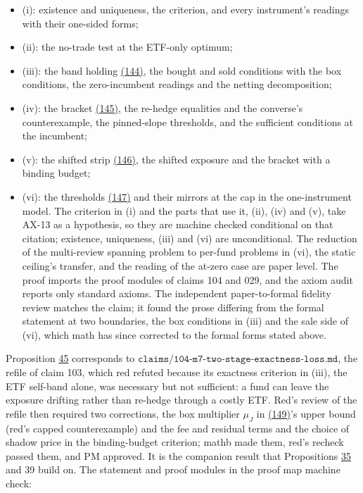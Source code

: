 \documentclass[11pt]{article}
\begin{document}
\begin{itemize}
  \item (i): existence and uniqueness, the criterion, and every instrument's
  readings with their one-sided forms;
  \item (ii): the no-trade test at the ETF-only optimum;
  \item (iii): the band holding \hyperref[eq:144]{(144)}, the bought and sold conditions with
  the box conditions, the zero-incumbent readings and the netting
  decomposition;
  \item (iv): the bracket \hyperref[eq:145]{(145)}, the re-hedge equalities and the converse's
  counterexample, the pinned-slope thresholds, and the sufficient
  conditions at the incumbent;
  \item (v): the shifted strip \hyperref[eq:146]{(146)}, the shifted exposure and the bracket
  with a binding budget;
  \item (vi): the thresholds \hyperref[eq:147]{(147)} and their mirrors at the cap in the
  one-instrument model.
The criterion in (i) and the parts that use it, (ii), (iv) and (v), take
AX-13 as a hypothesis, so they are machine checked conditional on that
citation; existence, uniqueness, (iii) and (vi) are unconditional. The
reduction of the multi-review spanning problem to per-fund problems in
(vi), the static ceiling's transfer, and the reading of the at-zero
case are paper level. The proof imports the proof modules of claims 104
and 029, and the axiom audit reports only standard axioms. The
independent paper-to-formal fidelity review matches the claim; it
found the prose differing from the formal statement at two boundaries,
the box conditions in (iii) and the sale side of (vi), which math has
since corrected to the formal forms stated above.
\end{itemize}

Proposition \hyperref[res:Proposition-45]{45} corresponds to
\(\texttt{claims/104-m7-two-stage-exactness-loss.md}\), the refile of claim 103,
which red refuted because its exactness criterion in (iii), the ETF
self-band alone, was necessary but not sufficient: a fund can leave
the exposure drifting rather than re-hedge through a costly ETF. Red's
review of the refile then required two corrections, the box
multiplier \(\mu_J\) in \hyperref[eq:149]{(149)}'s upper bound (red's capped counterexample) and
the fee and residual terms and the choice of shadow price in the
binding-budget criterion; mathb made them, red's recheck passed them,
and PM approved. It is the companion result that Propositions \hyperref[res:Proposition-35]{35} and
39 build on. The statement and proof modules in the proof map machine
check:
\end{document}

